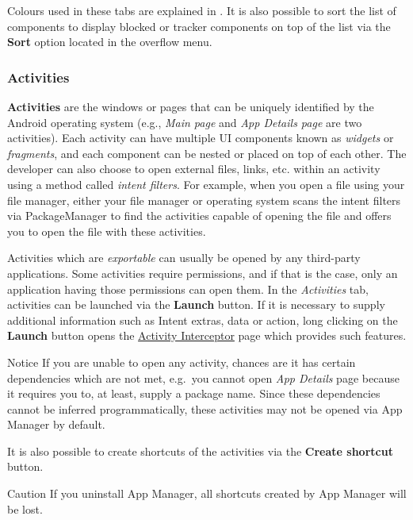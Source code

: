 Colours used in these tabs are explained in . It is also possible to sort the list
of components to display blocked or tracker components on top of the list via the \textbf{Sort} option located in the
overflow menu.

\subsubsection{Activities}\label{subsubsec:activities} %
\textbf{Activities} are the windows or pages that can be uniquely identified by the Android operating system (e.g.,
\textit{Main page} and \textit{App Details page} are two activities). Each activity can have multiple UI components
known as \textit{widgets} or \textit{fragments}, and each component can be nested or placed on top of each other. The
developer can also choose to open external files, links, etc. within an activity using a method called
\textit{intent filters}. For example, when you open a file using your file manager, either your file manager or
operating system scans the intent filters via PackageManager to find the activities capable of opening the file and
offers you to open the file with these activities.

Activities which are \textit{exportable} can usually be opened by any third-party applications. Some activities require
permissions, and if that is the case, only an application having those permissions can open them. In the
\textit{Activities} tab, activities can be launched via the \textbf{Launch} button. If it is necessary to supply
additional information such as Intent extras, data or action, long clicking on the \textbf{Launch} button opens the
\hyperref[sec:interceptor-page]{Activity Interceptor} page which provides such features.

\begin{tip}{Notice}
    If you are unable to open any activity, chances are it has certain dependencies which are not met, e.g.\ you
    cannot open \textit{App Details} page because it requires you to, at least, supply a package name. Since these
    dependencies cannot be inferred programmatically, these activities may not be opened via App Manager by default.
\end{tip}

It is also possible to create shortcuts of the activities via the \textbf{Create shortcut} button.

\begin{danger}{Caution}
    If you uninstall App Manager, all shortcuts created by App Manager will be lost.
\end{danger}

